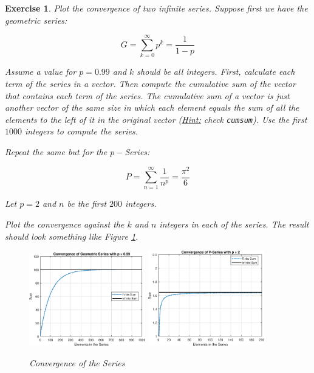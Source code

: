 \documentclass[a4paper,12pt]{article}
\newtheorem{exercise}{Exercise}
\begin{document}
\begin{exercise}
Plot the convergence of two infinite series. Suppose first we have the geometric series:

\[
G = \sum_{k=0}^{\infty} p^k = \frac{1}{1-p}
\]

Assume a value for $p =  0.99$ and $k$ should be all integers. First, calculate each term of the series in a vector. Then compute the cumulative sum of the vector that contains each term of the series. The cumulative sum of a vector is just another vector of the same size in which each element equals the sum of all the elements to the left of it in the original vector (\textit{\underline{Hint:} check} \texttt{cumsum}). Use the first $1000$ integers to compute the series.

Repeat the same but for the $p-$Series:

\[
P = \sum_{n=1}^{\infty} \frac{1}{n^p} = \frac{\pi^2}{6}
\]

Let $p=2$ and $n$ be the first $200$ integers.

Plot the convergence against the $k$ and $n$ integers in each of the series. The result should look something like Figure \ref{fig_series}.

\begin{figure}[htbp]
\centering
\includegraphics[width = 0.45\textwidth]{geoseries.eps}
\includegraphics[width = 0.45\textwidth]{pseries.eps}
\caption{Convergence of the Series}
\label{fig_series}
\end{figure}
\end{exercise}
\end{document}
